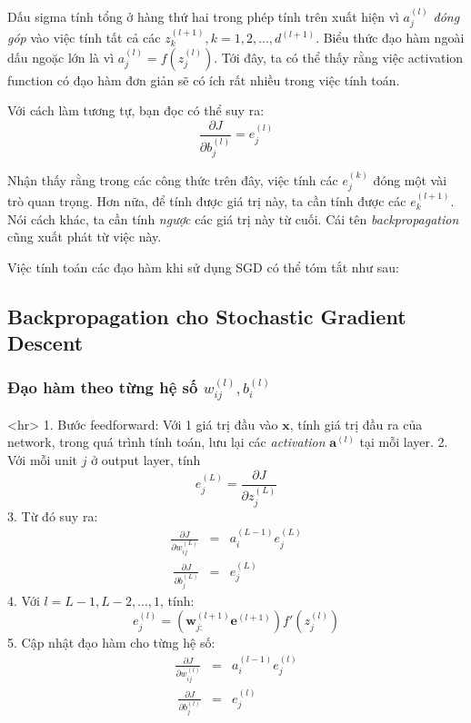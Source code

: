 Dấu sigma tính tổng ở hàng thứ hai trong phép tính trên xuất hiện vì $a_{j}^{(l)}$ \textit{đóng góp} vào việc tính tất cả các $z_k^{(l+1)}, k = 1, 2, \dots, d^{(l+1)}$. Biểu thức đạo hàm ngoài dấu ngoặc lớn là vì $a_j^{(l)}  = f(z_j^{(l)})$. Tới đây, ta có thể thấy rằng việc activation function có đạo hàm đơn giản sẽ có ích rất nhiều trong việc tính toán. 
 
Với cách làm tương tự, bạn đọc có thể suy ra: 
\begin{equation*} 
\frac{\partial J}{\partial b_j^{(l)}} = e_j^{(l)} 
\end{equation*} 
 
Nhận thấy rằng trong các công thức trên đây, việc tính các $e_j^{(k)}$ đóng một vài trò quan trọng. Hơn nữa, để tính được giá trị này, ta cần tính được các $e_k^{(l+1)}$. Nói cách khác, ta cần tính \textit{ngược} các giá trị này từ cuối. Cái tên \textit{backpropagation} cũng xuất phát từ việc này. 
 
Việc tính toán các đạo hàm khi sử dụng SGD có thể tóm tắt như sau: 
 
 
\subsection{Backpropagation cho Stochastic Gradient Descent}
 
 
\subsubsection{Đạo hàm theo từng hệ số $w_{ij}^{(l)}, b_{i}^{(l)}$}
<hr> 
1. Bước feedforward: Với 1 giá trị đầu vào $\mathbf{x}$, tính giá trị đầu ra của network, trong quá trình tính toán, lưu lại các \textit{activation} $\mathbf{a}^{(l)}$ tại mỗi layer. 
2. Với mỗi unit $j$ ở output layer, tính \begin{equation*}e_j^{(L)} = \frac{\partial J}{\partial z_j^{(L)}}\end{equation*} 
3. Từ đó suy ra: 
\begin{equation*} 
\begin{eqnarray} 
\frac{\partial J}{\partial w_{ij}^{(L)}} &=& a_i^{(L-1)}e_j^{(L)} \\\ 
\frac{\partial J}{\partial b_{j}^{(L)}} &=& e_j^{(L)} 
\end{eqnarray} 
\end{equation*} 
4. Với $l = L-1, L-2, ..., 1$, tính: 
\begin{equation*} 
e_j^{(l)} = \left( \mathbf{w}_{j:}^{(l+1)} \mathbf{e}^{(l+1)} \right) f'(z_j^{(l)}) 
\end{equation*} 
5. Cập nhật đạo hàm cho từng hệ số: 
\begin{equation*} 
\begin{eqnarray} 
\frac{\partial J}{\partial w_{ij}^{(l)}} &=& a_i^{(l-1)} e_j^{(l)} \\\ 
\frac{\partial J}{\partial b_{j}^{(l)}} &=& e_j^{(l)} 
\end{eqnarray} 
\end{equation*} 
 

